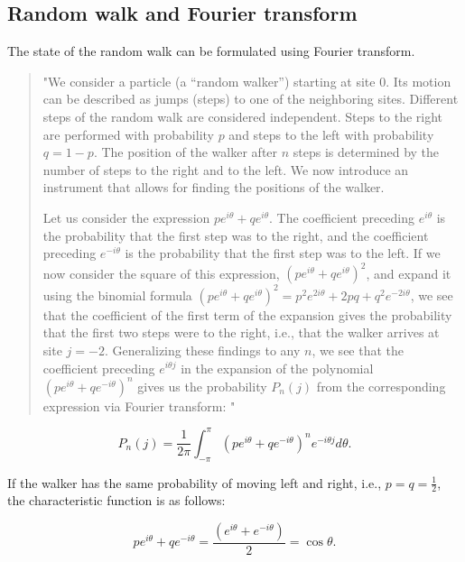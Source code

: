 \documentclass[reprint,amsmath,amssymb,aps,]{revtex4-1}
\numberwithin{equation}{section}%
\begin{document}
\subsection{Random walk and Fourier transform}

    The state of the random walk can be formulated using Fourier transform.
    
    \begin{quote}
        "We consider a particle (a ``random walker'') starting at site 0. Its motion can be described as jumps (steps) to one of the neighboring sites. Different steps of the random walk are considered independent. Steps to the right are performed with probability $p$ and steps to the left with probability $q = 1 - p$. The position of the walker after $n$ steps is determined by the number of steps to the right and to the left. We now introduce an instrument that allows for finding the positions of the walker.
        
        Let us consider the expression $p e^{i \theta} + q e^{i \theta}$. The coefficient preceding $e^{i \theta}$ is the probability that the first step was to the right, and the coefficient preceding $e^{-i \theta}$ is the probability that the first step was to the left. If we now consider the square of this expression, $(p e^{i \theta} + q e^{i \theta} )^2$, and expand it using the binomial formula $(p e^{i \theta} + q e^{i \theta} )^2 = p^{2} e^{2 i \theta} + 2 p q + q^{2} e^{-2 i \theta}$, we see that the coefficient of the first term of the expansion gives the probability that the first two steps were to the right, i.e., that the walker arrives at site $j = -2$. Generalizing these findings to any $n$, we see that the coefficient preceding  $e^{i \theta j}$ in the expansion of the polynomial $( p e^{i \theta} + q e^{-i \theta})^{n}$ gives us the probability $P_{n} (j)$ from the corresponding expression via Fourier transform: \cite{Klafter}"
    \end{quote}


    \begin{equation}
        P_{n} (j) = \frac{1}{2 \pi} \int_{-\pi}^{\pi} \left( p e^{i \theta} + q e^{-i \theta} \right)^{n} e^{-i \theta j} d\theta
        .
    \end{equation}


    If the walker has the same probability of moving left and right, i.e., $p = q = \frac{1}{2}$, the characteristic function is as follows:
    
    \begin{equation}
        p e^{i \theta} + q e^{-i \theta} = \frac{ \left( e^{i \theta} + e^{-i \theta} \right) }{2} = \cos \theta
        .
    \end{equation}
\end{document}
